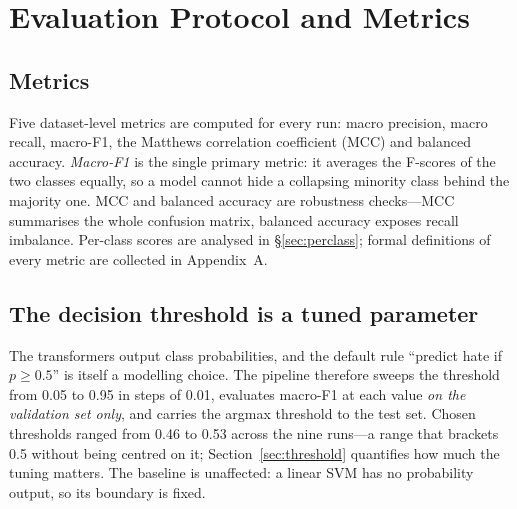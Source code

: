 \section{Evaluation Protocol and Metrics}
\label{sec:protocol}

\subsection{Metrics}
Five dataset-level metrics are computed for every run: macro precision, macro
recall, macro-F1, the Matthews correlation coefficient (MCC) and balanced
accuracy. \emph{Macro-F1} is the single primary metric: it averages the F-scores
of the two classes equally, so a model cannot hide a collapsing minority class
behind the majority one. MCC and balanced accuracy are robustness checks---MCC
summarises the whole confusion matrix, balanced accuracy exposes recall imbalance.
Per-class scores are analysed in \S\ref{sec:perclass}; formal definitions of
every metric are collected in Appendix~A.

\subsection{The decision threshold is a tuned parameter}
The transformers output class probabilities, and the default rule ``predict hate
if $p \geq 0.5$'' is itself a modelling choice. The pipeline therefore sweeps the
threshold from 0.05 to 0.95 in steps of 0.01, evaluates macro-F1 at each value
\emph{on the validation set only}, and carries the argmax threshold to the test
set. Chosen thresholds ranged from 0.46 to 0.53 across the nine runs---a range
that brackets 0.5 without being centred on it; Section~\ref{sec:threshold}
quantifies how much the tuning matters. The baseline is unaffected: a linear SVM
has no probability output, so its boundary is fixed.


